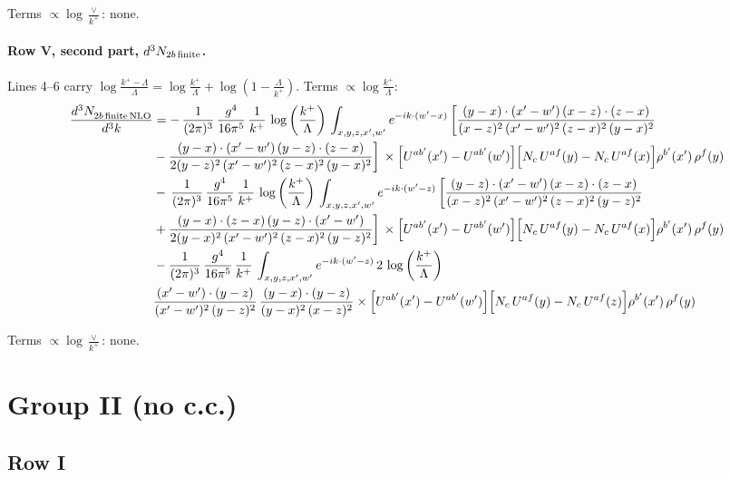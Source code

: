 \documentclass[10pt]{article}
\numberwithin{equation}{section}
\begin{document}
\noindent Terms $\propto\log\frac{\vee}{k^+}$: none.

\paragraph{Row V, second part, $d^3N_{2b\,\rm finite}$.}
Lines 4--6 carry $\log\frac{k^+-\Lambda}{\Lambda}=\log\frac{k^+}{\Lambda}+\log(1-\frac{\Lambda}{k^+})$.
\noindent Terms $\propto\log\frac{k^+}{\Lambda}$:
\begin{align}
    \frac{d^{3}N_{2b\,\rm finite\, NLO}^{\rm}}{d^{3}k} & =   -\, \frac{1}{(2\pi)^{3}}\,\frac{g^{4}}{16\pi^{5}}\,\frac{1}{k^{+}}\,\log{\left(\frac{k^{+}}{\Lambda}\right)}\,\int_{x,y,z,x',w'}e^{-ik\cdot(w'-x)}\, \bigg[\frac{(y-x)\cdot (x'-w')\,(x-z)\cdot (z-x)}{(x-z)^{2}\,(x'-w')^{2}\,(z-x)^{2}\,(y-x)^{2}}\notag \\ & -\frac{(y-x)\cdot (x'-w')\,(y-z)\cdot (z-x)}{2(y-z)^{2}\,(x'-w')^{2}\,(z-x)^{2}\,(y-x)^{2}}\bigg]\,\times \Big[U^{ab'}(x')-U^{ab'}(w')\Big]\Big[N_{c}\,U^{af}(y)-N_{c}\,U^{af}(x)\Big]\rho^{b'}(x')\,\rho^{f}(y) \notag \\
& -\, \frac{1}{(2\pi)^{3}}\,\frac{g^{4}}{16\pi^{5}}\,\frac{1}{k^{+}}\,\log{\left(\frac{k^{+}}{\Lambda}\right)}\,\int_{x,y,z,x',w'}e^{-ik\cdot(w'-z)}\,\bigg[\frac{(y-z)\cdot (x'-w')\,(x-z)\cdot (z-x)}{(x-z)^{2}\,(x'-w')^{2}\,(z-x)^{2}\,(y-z)^{2}}\notag \\ & +\frac{(y-x)\cdot (z-x)\,(y-z)\cdot (x'-w')}{2(y-x)^{2}\,(x'-w')^{2}\,(z-x)^{2}\,(y-z)^{2}}\bigg]\,\times \Big[U^{ab'}(x')-U^{ab'}(w')\Big]\Big[N_{c}\,U^{af}(y)-N_{c}\,U^{af}(x)\Big]\rho^{b'}(x')\,\rho^{f}(y) \notag \\
& - \frac{1}{(2\pi)^{3}}\,\frac{g^{4}}{16\pi^{5}}\,\frac{1}{k^{+}}\,\int_{x,y,z,x',w'}e^{-ik\cdot(w'-z)}\,2\,\log{\left(\frac{k^{+}}{\Lambda}\right)}\notag \\ & \frac{(x'-w')\cdot(y-z)}{(x'-w')^{2}\,(y-z)^{2}}\,\frac{(y-x)\cdot(y-z)}{(y-x)^{2}\,(x-z)^{2}}\times\Big[U^{ab'}(x')-U^{ab'}(w')\Big]\Big[N_{c}\,U^{af}(y)-N_{c}\,U^{af}(z)\Big]\rho^{b'}(x')\,\rho^{f}(y) \label{eq:J:G1V2bfin}
\end{align}

\noindent Terms $\propto\log\frac{\vee}{k^+}$: none.

\section{Group II (no c.c.)}\label{sec:LLgII}
\subsection{Row I}
\end{document}
